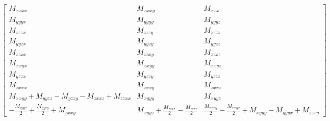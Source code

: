 \documentclass[fleqn,8pt,landscape]{jsarticle}
\begin{document}
\begin{align*}
\begin{bmatrix} M_{xxxx} & M_{xxxy} & M_{xxxz} \\ M_{yyyx} & M_{yyyy} & M_{yyyz} \\ M_{zzzx} & M_{zzzy} & M_{zzzz} \\ M_{yyzx} & M_{yyzy} & M_{yyzz} \\ M_{zzxx} & M_{zzxy} & M_{zzxz} \\ M_{xxyx} & M_{xxyy} & M_{xxyz} \\ M_{yzzx} & M_{yzzy} & M_{yzzz} \\ M_{zxxx} & M_{zxxy} & M_{zxxz} \\ M_{xxyy} + M_{yyzz} - M_{yzzy} - M_{zxxz} + M_{zzxx} & M_{xyyy} & M_{xyyz} \\ - \frac{M_{yyyz}}{2} + \frac{M_{yyzy}}{2} + M_{zxxy} & M_{xyyz} + \frac{M_{zzxz}}{2} - \frac{M_{zzzx}}{2} & \frac{M_{xxxy}}{2} - \frac{M_{xxyx}}{2} + M_{xyyy} - M_{yyyx} + M_{zzxy} \end{bmatrix}
\end{align*}
\end{document}
